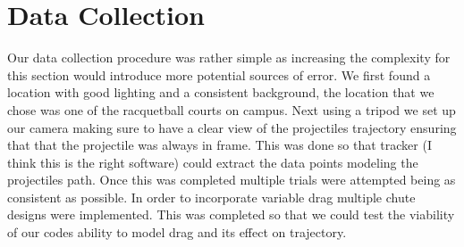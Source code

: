\section{Data Collection}
	Our data collection procedure was rather simple as increasing the complexity for this section would introduce more potential sources of error. We first found a location with good lighting and a consistent background, the location that we chose was one of the racquetball courts on campus. 
	Next using a tripod we set up our camera making sure to have a clear view of the projectiles trajectory ensuring that that the projectile was always in frame. This was done so that tracker (I think this is the right software) could extract the data points modeling the projectiles path. Once this was completed multiple trials were attempted being as consistent as possible. 
	In order to incorporate variable drag multiple chute designs were implemented. This was completed so that we could test the viability of our codes ability to model drag and its effect on trajectory. 

